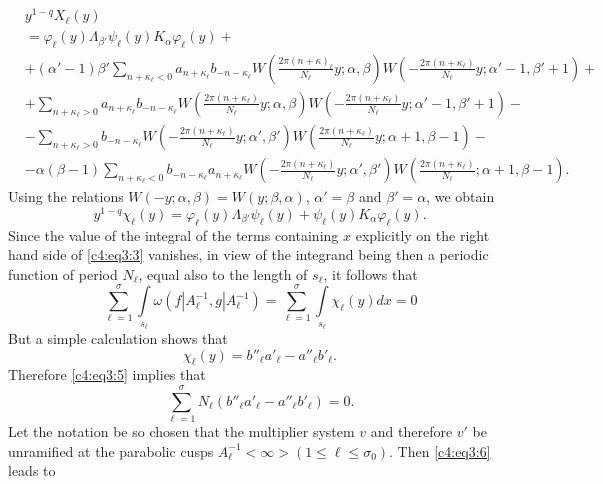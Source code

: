 {\fontsize{9}{11}\selectfont
\begin{align*}
& y^{1-q} X_{\ell}(y)\\
 & = \varphi_{\ell}(y)\Lambda_{\beta'}
\psi_{\ell}(y) K_{\alpha} \varphi_{\ell} (y) + \\
& + (\alpha'-1) \beta' \sum_{n+\kappa_{\ell}<0} a_{n+\kappa_{\ell}}
b_{-n-\kappa_{\ell}} W(\frac{2\pi(n+\kappa)_{\ell}}{N_{\ell}}
y;\alpha,\beta)
W(-\frac{2\pi(n+\kappa_{\ell})}{N_{\ell}}y;\alpha'-1,\beta'+1) +\\
& + \sum_{n+\kappa_{\ell}>0} a_{n+\kappa_{\ell}} b_{-n-\kappa_{\ell}}
W(\frac{2\pi(n+\kappa_{\ell})}{N_{\ell}}y;\alpha,\beta)
W(-\frac{2\pi(n+\kappa_{\ell})}{N_{\ell}}y;\alpha'-1, \beta'+1)-\\
& - \sum_{n+\kappa_{\ell}>0}  b_{-n-\kappa_{\ell}}
W(-\frac{2\pi(n+\kappa_{\ell})}{N_{\ell}}y; \alpha',\beta')
W(\frac{2\pi(n+\kappa_{\ell})}{N_{\ell}}y;\alpha+1, \beta-1)-\\
& -\alpha(\beta-1) \sum_{n+\kappa_{\ell}<0}
b_{-n-\kappa_{\ell}}a_{n+\kappa_{\ell}}
W(-\frac{2\pi(n+\kappa_{\ell})}{N_{\ell}}y;\alpha', \beta') W
(\frac{2\pi(n+\kappa_{\ell})}{N_{\ell}}; \alpha+1, \beta-1).
\end{align*}}\relax
Using the relations $W(-y;\alpha, \beta) = W(y;\beta,\alpha)$,
$\alpha'=\beta$ and $\beta'=\alpha$, we obtain 
$$
y^{1-q} \chi_{\ell} (y) = \varphi_{\ell}(y) \Lambda_{\beta'}
\psi_{\ell}(y) + \psi_{\ell}(y) K_{\alpha} \varphi_{\ell} (y).
$$
Since \pageoriginale the value of the integral of the terms containing
$x$ explicitly on the right hand side of \eqref{c4:eq3:3} vanishes, in view of the
integrand being then a periodic function of period $N_{\ell}$, equal
also to the length of $s_{\ell}$, it follows that 
\begin{equation*}
\sum^{\sigma}_{\ell=1} \int\limits_{s_{\ell}} \omega(f|A^{-1}_{\ell},
g|A^{-1}_{\ell}) = \sum^{\sigma}_{\ell=1} \int\limits_{s_{\ell}}
\chi_{\ell} (y) dx =0 \tag{5}\label{c4:eq3:5}
\end{equation*}
But a simple calculation shows that
$$
\chi_{\ell}(y) = b''_{\ell} a'_{\ell} - a''_{\ell} b'_{\ell}.
$$
Therefore \eqref{c4:eq3:5} implies that 
\begin{equation*}
\sum^{\sigma}_{\ell=1} N_{\ell} (b''_{\ell} a'_{\ell} - a''_{\ell}
b'_{\ell}) =0. \tag{6}\label{c4:eq3:6}
\end{equation*}
Let the notation be so chosen that the multiplier system $v$ and
therefore $v'$ be unramified at the parabolic cusps
$A^{-1}_{\ell}<\infty>(1\leq \ell \leq \sigma_0)$. Then \eqref{c4:eq3:6} leads to
